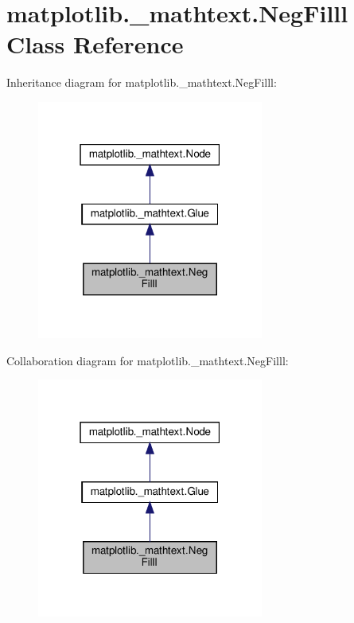 \hypertarget{classmatplotlib_1_1__mathtext_1_1NegFilll}{}\section{matplotlib.\+\_\+mathtext.\+Neg\+Filll Class Reference}
\label{classmatplotlib_1_1__mathtext_1_1NegFilll}


Inheritance diagram for matplotlib.\+\_\+mathtext.\+Neg\+Filll\+:
\nopagebreak
\begin{figure}[H]
\begin{center}
\leavevmode
\includegraphics[width=211pt]{classmatplotlib_1_1__mathtext_1_1NegFilll__inherit__graph}
\end{center}
\end{figure}


Collaboration diagram for matplotlib.\+\_\+mathtext.\+Neg\+Filll\+:
\nopagebreak
\begin{figure}[H]
\begin{center}
\leavevmode
\includegraphics[width=211pt]{classmatplotlib_1_1__mathtext_1_1NegFilll__coll__graph}
\end{center}
\end{figure}
